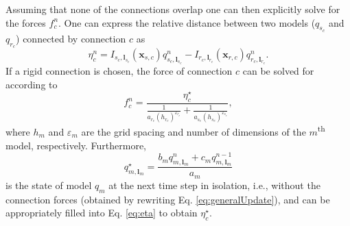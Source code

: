 \documentclass{article}
\begin{document}

Assuming that none of the connections overlap one can then explicitly solve for the forces $f_c^n$. One can express the relative distance between two models ($q_{s_c}$ and $q_{r_c}$) connected by connection $c$ as
\begin{equation}\label{eq:eta}
    \eta_c^n =  I_{s_c,\boldsymbol{l}_{s_c}}(\boldsymbol{x}_{s,c})q_{s_c, \boldsymbol{l}_{s_c}}^n - I_{r_c,\boldsymbol{l}_{r_c}}(\boldsymbol{x}_{r,c})q_{r_c, \boldsymbol{l}_{r_c}}^n.
\end{equation}
If a rigid connection is chosen, the force of connection $c$ can be solved for according to
\begin{equation}\label{eq:rigidConnDisc}
    f_c^n = \frac{\eta^\star_c}{\frac{1}{a_{r_c}(h_{r_c})^{\varepsilon_{r_c}}}+ \frac{1}{a_{s_c}(h_{s_c})^{\varepsilon_{s_c}}}},
\end{equation}
where $h_m$ and $\varepsilon_m$ are the grid spacing and number of dimensions of the $m$\textsuperscript{th} model, respectively. Furthermore, 
\begin{equation}
    q_{m,\boldsymbol{l}_m}^\star = \frac{b_m q_{m,\boldsymbol{l}_m}^n + c_m q_{m,\boldsymbol{l}_m}^{n-1}}{a_m}
\end{equation}
is the state of model $q_m$ at the next time step in isolation,  i.e., without the connection forces (obtained by rewriting Eq. \eqref{eq:generalUpdate}), and can be appropriately filled into Eq. \eqref{eq:eta} to obtain $\eta_c^\star$.
\end{document}
